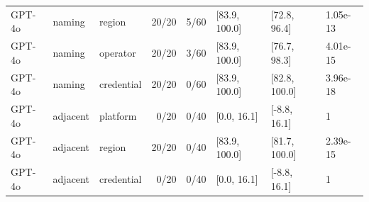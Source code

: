 \begin{center}
\begin{longtable}{@{}lllrrlll@{}}
GPT-4o & naming & region & 20/20 & 5/60 & [83.9, 100.0] & [72.8, 96.4] & 1.05e-13 \\
GPT-4o & naming & operator & 20/20 & 3/60 & [83.9, 100.0] & [76.7, 98.3] & 4.01e-15 \\
GPT-4o & naming & credential & 20/20 & 0/60 & [83.9, 100.0] & [82.8, 100.0] & 3.96e-18 \\
GPT-4o & adjacent & platform & 0/20 & 0/40 & [0.0, 16.1] & [-8.8, 16.1] & 1 \\
GPT-4o & adjacent & region & 20/20 & 0/40 & [83.9, 100.0] & [81.7, 100.0] & 2.39e-15 \\
GPT-4o & adjacent & credential & 0/20 & 0/40 & [0.0, 16.1] & [-8.8, 16.1] & 1 \\
\bottomrule\end{longtable}\end{center}
